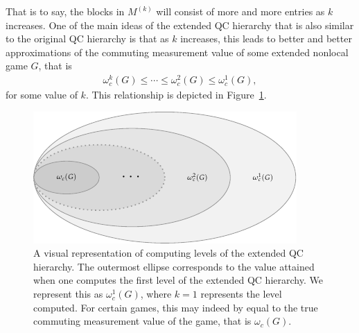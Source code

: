 That is to say, the blocks in $M^{(k)}$ will consist of more and more entries as $k$ increases. One of the main ideas of the extended QC hierarchy that is also similar to the original QC hierarchy is that as $k$ increases, this leads to better and better approximations of the commuting measurement value of some extended nonlocal game $G$, that is
\begin{align}
	\omega_c^k(G) \leq \cdots \leq \omega_c^{2}(G) \leq \omega_c^1(G),
\end{align}
for some value of $k$. This relationship is depicted in Figure~\ref{fig:qc-hierarchy-levels}. 

\begin{figure}[!htpb] 
	\begin{center}
		\includegraphics[scale=1.5]{figures/qc_hierarchy_levels.pdf}
	\end{center}
		\caption[Levels of the extended QC hierarchy.]{A visual representation of computing levels of the extended QC hierarchy. The outermost ellipse corresponds to the value attained when one computes the first level of the extended QC hierarchy. We represent this as $\omega^1_c(G)$, where $k=1$ represents the level computed. For certain games, this may indeed by equal to the true commuting measurement value of the game, that is $\omega_c(G)$.}
\label{fig:qc-hierarchy-levels}		
\end{figure}  

